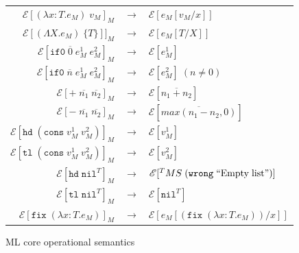 \begin{figure}
\onehalfspacing
\begin{center}
\begin{tabular}{rcl}
$\mathscr{E}[(\lambda x:T.e_{M})\;v_{M}]_{M}$ & $\rightarrow$ & $\mathscr{E}[e_{M}[v_{M}/x]]$ \\
$\mathscr{E}[(\Lambda X.e_{M})\;\lbrace T\rbrace]]_{M}$ & $\rightarrow$ & $\mathscr{E}[e_{M}[T/X]]$ \\
$\mathscr{E}[\mathtt{if0}\;\overline{0}\;e_{M}^{1}\;e_{M}^{2}]_{M}$ & $\rightarrow$ & $\mathscr{E}[e_{M}^{1}]$ \\
$\mathscr{E}[\mathtt{if0}\;\overline{n}\;e_{M}^{1}\;e_{M}^{2}]_{M}$ & $\rightarrow$ & $\mathscr{E}[e_{M}^{2}]\;(n\neq0)$ \\
$\mathscr{E}[+\;\overline{n_{1}}\;\overline{n_{2}}]_{M}$ & $\rightarrow$ & $\mathscr{E}[\overline{n_{1}+n_{2}}]$ \\
$\mathscr{E}[-\;\overline{n_{1}}\;\overline{n_{2}}]_{M}$ & $\rightarrow$ & $\mathscr{E}[\overline{max(n_{1}-n_{2},0)}]$ \\
$\mathscr{E}[\mathtt{hd}\;(\mathtt{cons}\;v_{M}^{1}\;v_{M}^{2})]_{M}$ & $\rightarrow$ & $\mathscr{E}[v_{M}^{1}]$ \\
$\mathscr{E}[\mathtt{tl}\;(\mathtt{cons}\;v_{M}^{1}\;v_{M}^{2})]_{M}$ & $\rightarrow$ & $\mathscr{E}[v_{M}^{2}]$ \\
$\mathscr{E}[\mathtt{hd}\;\mathtt{nil}^{T}]_{M}$ & $\rightarrow$ & $\mathscr{E}[^{T}MS\;(\mathtt{wrong}\;\mathrm{``Empty\;list"})]$ \\
$\mathscr{E}[\mathtt{tl}\;\mathtt{nil}^{T}]_{M}$ & $\rightarrow$ & $\mathscr{E}[\mathtt{nil}^{T}]$ \\
$\mathscr{E}[\mathtt{fix}\;(\lambda x:T.e_{M})]_{M}$ & $\rightarrow$ & $\mathscr{E}[e_{M}[(\mathtt{fix}\;(\lambda x:T.e_{M}))/x]]$
\end{tabular}
\end{center}
\caption{ML core operational semantics}
\label{fig:mcos}
\end{figure}